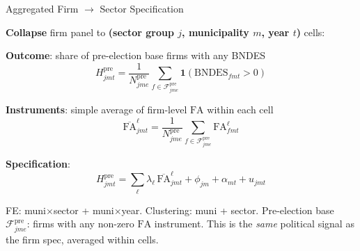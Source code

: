\documentclass[aspectratio=169,11pt]{beamer}
\newcommand{\FA}{\mathrm{FA}}
\begin{document}
\begin{frame}{Aggregated Firm $\to$ Sector Specification}

\textbf{Collapse} firm panel to \textbf{(sector group $j$, municipality $m$, year $t$)} cells:

\smallskip

\textbf{Outcome}: share of pre-election base firms with any BNDES
\begin{equation*}
    H^{\mathrm{pre}}_{jmt} = \frac{1}{N^{\mathrm{pre}}_{jme}} \sum_{f \in \mathcal{F}^{\mathrm{pre}}_{jme}} \mathbf{1}(\text{BNDES}_{fmt} > 0)
\end{equation*}

\vspace{-6pt}
\textbf{Instruments}: simple average of firm-level $\FA$ within each cell
\begin{equation*}
    \overline{\FA}^\ell_{jmt} = \frac{1}{N^{\mathrm{pre}}_{jme}} \sum_{f \in \mathcal{F}^{\mathrm{pre}}_{jme}} \FA^\ell_{fmt}
\end{equation*}

\vspace{-6pt}
\textbf{Specification}:
\begin{equation*}
    H^{\mathrm{pre}}_{jmt} = \sum_\ell \lambda_\ell\, \overline{\FA}^\ell_{jmt} + \phi_{jm} + \alpha_{mt} + u_{jmt}
\end{equation*}

\vspace{-4pt}
{\footnotesize FE: muni$\times$sector + muni$\times$year. Clustering: muni + sector. Pre-election base $\mathcal{F}^{\mathrm{pre}}_{jme}$: firms with any non-zero $\FA$ instrument. This is the \emph{same} political signal as the firm spec, averaged within cells.}

\end{frame}
\end{document}
